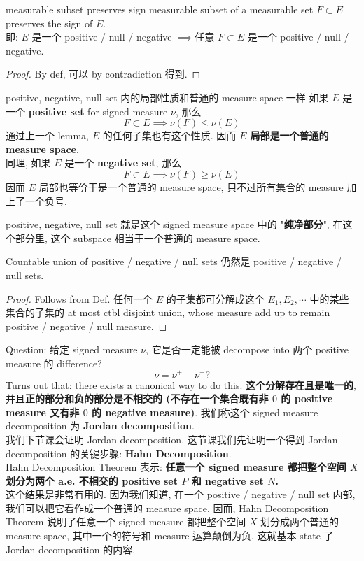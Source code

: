 \documentclass[lang=cn,11pt]{elegantbook}
\begin{document}
\begin{lemma}{measurable subset preserves sign}
measurable subset of a measurable set $F\subset E$ preserves the sign of $E$.\\
即: $E$ 是一个 positive / null / negative $\implies$任意 $F \subset E$ 是一个 positive / null / negative.
\end{lemma}
\begin{proof}
By def, 可以 by contradiction 得到.
\end{proof}


\begin{lemma}{positive, negative, null set 内的局部性质和普通的 measure space 一样}
如果 $E$ 是一个\textbf{ positive set} for signed measure $\nu$, 那么 \[
F \subset E \implies \nu (F) \leq \nu (E)
\]
通过上一个 lemma, $E$ 的任何子集也有这个性质. 因而 \textbf{$E$ 局部是一个普通的 measure space}. \\
同理, 如果 $E$  是一个\textbf{ negative set}, 那么 \[
F \subset E \implies \nu (F) \geq \nu (E)
\]
因而 $E$ 局部也等价于是一个普通的 measure space, 只不过所有集合的 measure 加上了一个负号.
\end{lemma}
\begin{remark}
    positive, negative, null set 就是这个 signed measure space 中的 "\textbf{纯净部分}", 在这个部分里, 这个 subspace 相当于一个普通的 measure space. 
\end{remark}



\begin{lemma}
    Countable union of positive / negative / null sets 仍然是 positive / negative / null sets.
\end{lemma}
\begin{proof}
    Follows from Def. 任何一个 $E$ 的子集都可分解成这个 $E_1, E_2,\cdots$ 中的某些集合的子集的 at most ctbl disjoint union, whose measure add up to remain positive / negative / null measure.
\end{proof}

Question:
给定 signed measure $\nu$, 它是否一定能被 decompose into 两个 positive measure 的 difference? \[
\nu  = \nu ^+ - \nu^- ?
\]
Turns out that: there exists a canonical way to do this. \textbf{这个分解存在且是唯一的}, 并且\textbf{正的部分和负的部分是不相交的 (不存在一个集合既有非 $0$ 的 positive measure 又有非 $0$ 的 negative measure)}. 我们称这个 signed measure decomposition 为\textbf{ Jordan decomposition}.\\
我们下节课会证明 Jordan decomposition. 这节课我们先证明一个得到 Jordan decomposition 的关键步骤: \textbf{Hahn Decomposition}. \\
Hahn Decomposition Theorem 表示: \textbf{任意一个 signed measure 都把整个空间 $X$ 划分为两个 a.e. 不相交的 positive set $P$ 和 negative set $N$.}\\
这个结果是非常有用的. 因为我们知道, 在一个 positive / negative / null set 内部, 我们可以把它看作成一个普通的 measure space. 因而, Hahn Decomposition Theorem 说明了任意一个 signed measure 都把整个空间 $X$ 划分成两个普通的 measure space, 其中一个的符号和 measure 运算颠倒为负. 这就基本 state 了 Jordan decomposition 的内容.
\end{document}
